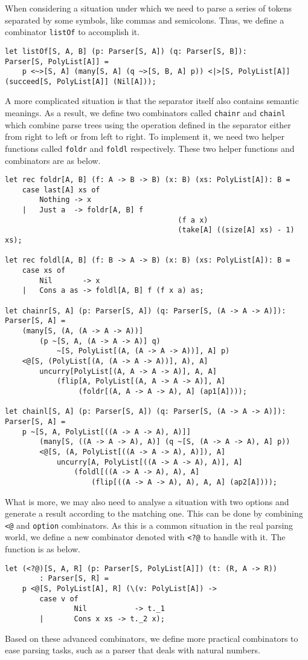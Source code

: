 When considering a situation under which we need to parse a series of tokens separated by some symbols, like commas and semicolons. Thus, we define a combinator \texttt{listOf} to accomplish it.
\begin{lstlisting}
let listOf[S, A, B] (p: Parser[S, A]) (q: Parser[S, B]):
Parser[S, PolyList[A]] =
    p <~>[S, A] (many[S, A] (q ~>[S, B, A] p)) <|>[S, PolyList[A]] (succeed[S, PolyList[A]] (Nil[A]));
\end{lstlisting}
A more complicated situation is that the separator itself also contains semantic meanings. As a result, we define two combinators called \texttt{chainr} and \texttt{chainl} which combine parse trees using the operation defined in the separator either from right to left or from left to right. To implement it, we need two helper functions called \texttt{foldr} and \texttt{foldl} respectively. These two helper functions and combinators are as below.
\begin{lstlisting}
let rec foldr[A, B] (f: A -> B -> B) (x: B) (xs: PolyList[A]): B =
    case last[A] xs of
        Nothing -> x
    |   Just a  -> foldr[A, B] f
                                        (f a x)
                                        (take[A] ((size[A] xs) - 1) xs);

let rec foldl[A, B] (f: B -> A -> B) (x: B) (xs: PolyList[A]): B =
    case xs of
        Nil       -> x
    |   Cons a as -> foldl[A, B] f (f x a) as;

let chainr[S, A] (p: Parser[S, A]) (q: Parser[S, (A -> A -> A)]):
Parser[S, A] =
    (many[S, (A, (A -> A -> A))]
        (p ~[S, A, (A -> A -> A)] q)
            ~[S, PolyList[(A, (A -> A -> A))], A] p)
    <@[S, (PolyList[(A, (A -> A -> A))], A), A]
        uncurry[PolyList[(A, A -> A -> A)], A, A]
            (flip[A, PolyList[(A, A -> A -> A)], A]
                 (foldr[(A, A -> A -> A), A] (ap1[A])));

let chainl[S, A] (p: Parser[S, A]) (q: Parser[S, (A -> A -> A)]):
Parser[S, A] =
    p ~[S, A, PolyList[((A -> A -> A), A)]]
        (many[S, ((A -> A -> A), A)] (q ~[S, (A -> A -> A), A] p))
        <@[S, (A, PolyList[((A -> A -> A), A)]), A]
            uncurry[A, PolyList[((A -> A -> A), A)], A]
                (foldl[((A -> A -> A), A), A]
                    (flip[((A -> A -> A), A), A, A] (ap2[A])));
\end{lstlisting}
What is more, we may also need to analyse a situation with two options and generate a result according to the matching one. This can be done by combining \texttt{<@} and \texttt{option} combinators. As this is a common situation in the real parsing world, we define a new combinator denoted with \texttt{<?@} to handle with it. The function is as below.
\begin{lstlisting}
let (<?@)[S, A, R] (p: Parser[S, PolyList[A]]) (t: (R, A -> R))
        : Parser[S, R] =
    p <@[S, PolyList[A], R] (\(v: PolyList[A]) ->
        case v of
                Nil           -> t._1
        |       Cons x xs -> t._2 x);
\end{lstlisting}
Based on these advanced combinators, we define more practical combinators to ease parsing tasks, such as a parser that deals with natural numbers.

